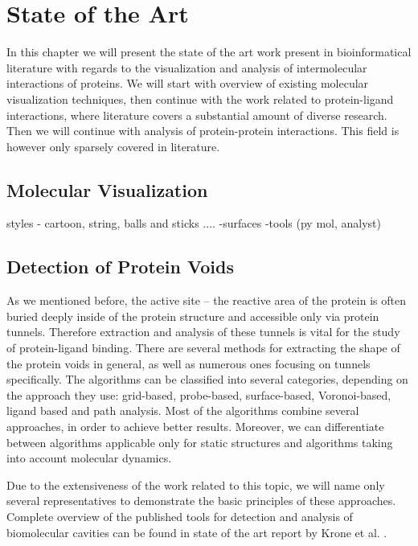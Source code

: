 \chapter{State of the Art}
\label{Sec:star}
In this chapter we will present the state of the art work present in bioinformatical literature with regards to the visualization and analysis of intermolecular interactions of proteins. We will start with overview of existing molecular visualization techniques, then continue with the work related to protein-ligand interactions, where literature covers a substantial amount of diverse research. Then we will continue with analysis of protein-protein interactions. This field is however only sparsely covered in literature.

\section{Molecular Visualization}
styles - cartoon, string, balls and sticks ....
-surfaces
-tools (py mol, analyst)

\section{Detection of Protein Voids}
As we mentioned before, the active site -- the reactive area of the protein is often buried deeply inside of the protein structure and accessible only via protein tunnels. Therefore extraction and analysis of these tunnels is vital for the study of protein-ligand binding. There are several methods for extracting the shape of the protein voids in general, as well as numerous ones focusing on tunnels specifically. The algorithms can be classified into several categories, depending on the approach they use: grid-based, probe-based, surface-based, Voronoi-based, ligand based and path analysis. Most of the algorithms combine several approaches, in order to achieve better results. Moreover, we can differentiate  between algorithms applicable only for static structures and algorithms taking into account molecular dynamics.

Due to the extensiveness of the work related to this topic, we will name only several representatives to demonstrate the basic principles of these approaches. Complete overview of the published tools for detection and analysis of biomolecular cavities can be found in state of the art report by Krone et al. \cite{krone2016visual}.

